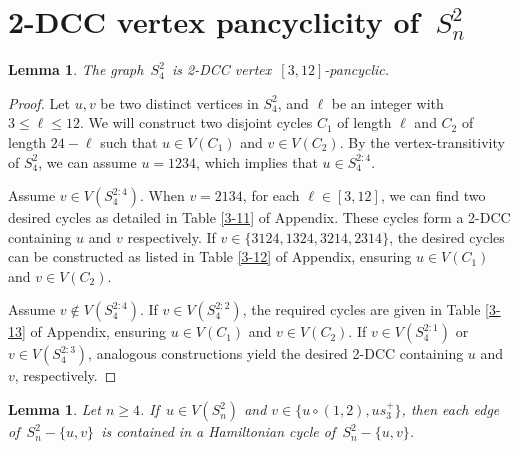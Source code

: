 \documentclass[12pt,a4paper]{amsart}
\newtheorem{lemma}[thm]{Lemma}
\theoremstyle{definition}
\begin{document}
	\section{2-DCC vertex pancyclicity of~$S_n^2$}
	
	\begin{lemma}\label{3-1}
		The graph~$S_4^2$~is 2-DCC vertex~$[3,12]$-pancyclic.
	\end{lemma}
    \begin{proof}
      Let $u,v$ be two distinct vertices in $S_4^2$, and $\ell$ be an integer with $3 \le \ell \le 12$. We will construct two disjoint cycles $C_1$ of length $\ell$ and $C_2$ of length $24 - \ell$ such that $u \in V(C_1)$ and $v \in V(C_2)$. By the vertex-transitivity of $S_4^2$, we can assume $u = 1234$, which implies that $u\in S_4^{2:4}$.

        Assume $v \in V(S_4^{2:4})$. When $v = 2134$, for each $\ell \in [3,12]$, we can find two desired cycles as detailed in Table \ref{3-11} of Appendix. These cycles form a 2-DCC containing $u$ and $v$ respectively. If $v \in \{3124,1324,3214,2314\}$, the desired cycles can be constructed as listed in Table \ref{3-12} of Appendix, ensuring $u \in V(C_1)$ and $v \in V(C_2)$.

Assume $v \notin V(S_4^{2:4})$. If $v \in V(S_4^{2:2})$, the required cycles are given in Table \ref{3-13} of Appendix, ensuring $u \in V(C_1)$ and $v \in V(C_2)$. If $v \in V(S_4^{2:1})$ or $v \in V(S_4^{2:3})$, analogous constructions yield the desired 2-DCC containing $u$ and $v$, respectively.
    \end{proof}



	\begin{lemma}\label{3-2}
		Let $n\ge4$. If~$u\in V(S_n^2)$ and $v\in\{u\circ(1,2),us_3^{+}\}$, then each edge of~$S_n^2-\{u,v\}$~is contained in a Hamiltonian cycle of~$S_n^2-\{u,v\}$.
	\end{lemma}
\end{document}
